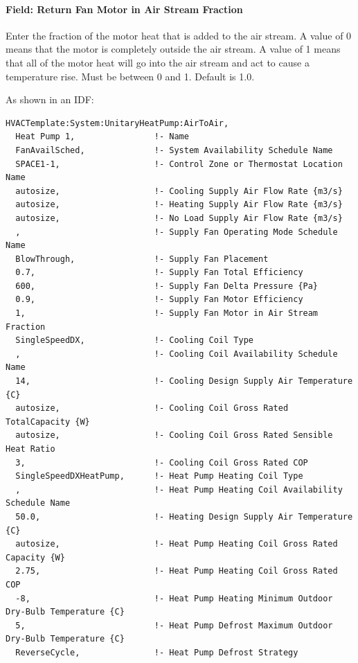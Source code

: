 \paragraph{Field: Return Fan Motor in Air Stream Fraction}\label{field-return-fan-motor-in-air-stream-fraction-1}

Enter the fraction of the motor heat that is added to the air stream. A value of 0 means that the motor is completely outside the air stream. A value of 1 means that all of the motor heat will go into the air stream and act to cause a temperature rise. Must be between 0 and 1. Default is 1.0.

As shown in an IDF:

\begin{lstlisting}
HVACTemplate:System:UnitaryHeatPump:AirToAir,
  Heat Pump 1,                !- Name
  FanAvailSched,              !- System Availability Schedule Name
  SPACE1-1,                   !- Control Zone or Thermostat Location Name
  autosize,                   !- Cooling Supply Air Flow Rate {m3/s}
  autosize,                   !- Heating Supply Air Flow Rate {m3/s}
  autosize,                   !- No Load Supply Air Flow Rate {m3/s}
  ,                           !- Supply Fan Operating Mode Schedule Name
  BlowThrough,                !- Supply Fan Placement
  0.7,                        !- Supply Fan Total Efficiency
  600,                        !- Supply Fan Delta Pressure {Pa}
  0.9,                        !- Supply Fan Motor Efficiency
  1,                          !- Supply Fan Motor in Air Stream Fraction
  SingleSpeedDX,              !- Cooling Coil Type
  ,                           !- Cooling Coil Availability Schedule Name
  14,                         !- Cooling Design Supply Air Temperature {C}
  autosize,                   !- Cooling Coil Gross Rated TotalCapacity {W}
  autosize,                   !- Cooling Coil Gross Rated Sensible Heat Ratio
  3,                          !- Cooling Coil Gross Rated COP
  SingleSpeedDXHeatPump,      !- Heat Pump Heating Coil Type
  ,                           !- Heat Pump Heating Coil Availability Schedule Name
  50.0,                       !- Heating Design Supply Air Temperature {C}
  autosize,                   !- Heat Pump Heating Coil Gross Rated Capacity {W}
  2.75,                       !- Heat Pump Heating Coil Gross Rated COP
  -8,                         !- Heat Pump Heating Minimum Outdoor Dry-Bulb Temperature {C}
  5,                          !- Heat Pump Defrost Maximum Outdoor Dry-Bulb Temperature {C}
  ReverseCycle,               !- Heat Pump Defrost Strategy

\end{lstlisting}
